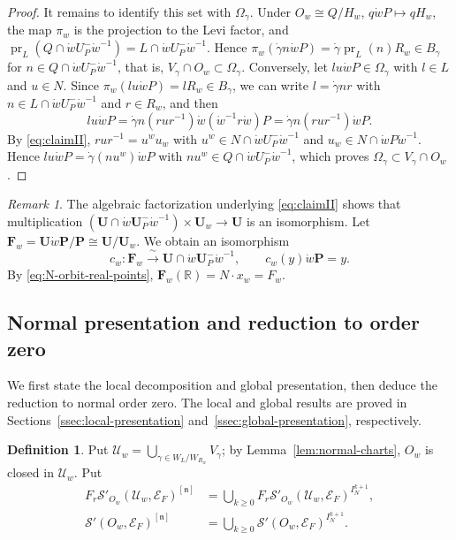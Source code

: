 \documentclass[a4paper,12pt]{amsart}
\numberwithin{equation}{section}
\theoremstyle{definition}
\newtheorem{definition}[theorem]{Definition}
\theoremstyle{remark}
\newtheorem{remark}[theorem]{Remark}
\newcommand{\pP}{\mathbf P}
\newcommand{\U}{\mathbf U}
\newcommand{\F}{\mathbf F}
\newcommand{\R}{\mathbb R}
\newcommand{\fn}{\mathfrak n}
\newcommand{\IN}{I_N}
\newcommand{\mcU}{\mathcal U}
\newcommand{\mcS}{\mathcal S}
\newcommand{\mcE}{\mathcal E}
\newcommand{\pr}{\operatorname{pr}}
\begin{document}
\begin{proof}
It remains to identify this set with $\Omega_\gamma$. Under $O_w\cong Q/H_w$, $q\dot wP\mapsto qH_w$, the map $\pi_w$ is the projection to the Levi factor, and $\pr_L(Q\cap\dot wU_P^-\dot w^{-1})=L\cap\dot wU_P^-\dot w^{-1}$. Hence $\pi_w(\dot\gamma n\dot wP)=\dot\gamma\pr_L(n)R_w\in B_\gamma$ for $n\in Q\cap\dot wU_P^-\dot w^{-1}$, that is, $V_\gamma\cap O_w\subset\Omega_\gamma$. Conversely, let $lu\dot wP\in\Omega_\gamma$ with $l\in L$ and $u\in N$. Since $\pi_w(lu\dot wP)=lR_w\in B_\gamma$, we can write $l=\dot\gamma nr$ with $n\in L\cap\dot wU_P^-\dot w^{-1}$ and $r\in R_w$, and then
\[
 lu\dot wP=\dot\gamma n(rur^{-1})\dot w(\dot w^{-1}r\dot w)P=\dot\gamma n(rur^{-1})\dot wP.
\]
By \eqref{eq:claimII}, $rur^{-1}=u^wu_w$ with $u^w\in N\cap\dot wU_P^-\dot w^{-1}$ and $u_w\in N\cap\dot wP\dot w^{-1}$. Hence $lu\dot wP=\dot\gamma(nu^w)\dot wP$ with $nu^w\in Q\cap\dot wU_P^-\dot w^{-1}$, which proves $\Omega_\gamma\subset V_\gamma\cap O_w$.
\end{proof}

\begin{remark}\label{rem:cw}
The algebraic factorization underlying \eqref{eq:claimII} shows that multiplication $(\U\cap\dot w\U_P^-\dot w^{-1})\times\U_w\to\U$ is an isomorphism. Let $\F_w=\U\dot w\pP/\pP\cong\U/\U_w$. We obtain an isomorphism
\[
 c_w:\F_w\xrightarrow{\ \sim\ }\U\cap\dot w\U_P^-\dot w^{-1},\qquad c_w(y)\dot w\pP=y.
\]
By \eqref{eq:N-orbit-real-points}, $\F_w(\R)=N\cdot x_w=F_w$.
\end{remark}

\subsection{Normal presentation and reduction to order zero}\label{ssec:order-zero}

We first state the local decomposition and global presentation, then deduce the reduction to normal order zero. The local and global results are proved in Sections~\ref{ssec:local-presentation} and~\ref{ssec:global-presentation}, respectively.

\begin{definition}\label{def:Uw}
Put $\mcU_w=\bigcup_{\gamma\in W_L/W_{R_w}}V_\gamma$; by Lemma~\ref{lem:normal-charts}, $O_w$ is closed in $\mcU_w$. Put
\[
\begin{aligned}
 F_r\mcS'_{O_w}(\mcU_w,\mcE_F)^{[\fn]}&=\bigcup_{k\ge0}F_r\mcS'_{O_w}(\mcU_w,\mcE_F)^{\IN^{k+1}},\\
 \mcS'(O_w,\mcE_F)^{[\fn]}&=\bigcup_{k\ge0}\mcS'(O_w,\mcE_F)^{\IN^{k+1}}.
\end{aligned}
\]
\end{definition}
\end{document}
